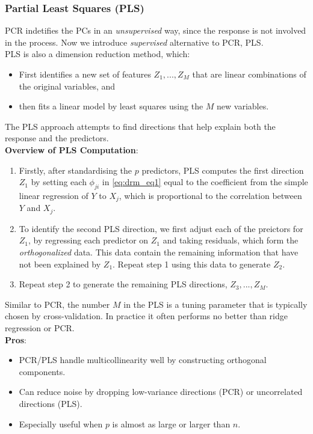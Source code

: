 \documentclass[11pt]{article}
\begin{document}
\subsubsection{Partial Least Squares (PLS)}
\noindent PCR indetifies the PCs in an \textit{unsupervised} way, since the response is not involved in the process. Now we introduce \textit{supervised} alternative to PCR, PLS. \\

\noindent PLS is also a dimension reduction method, which:
\begin{itemize}
    \item First identifies a new set of features $Z_1,...,Z_M$ that are linear combinations of the original variables, and
    \item then fits a linear model by least squares using the $M$ new variables.
\end{itemize}
\noindent The PLS approach attempts to find directions that help explain both the response and the predictors. \\

\noindent \textbf{Overview of PLS Computation}:
\begin{enumerate}
    \item Firstly, after standardising the $p$ predictors, PLS computes the first direction $Z_1$ by setting each $\phi_{ji}$ in \eqref{eq:drm_eq1} equal to the coefficient from the simple linear regression of $Y$ to $X_j$, which is proportional to the correlation between $Y$ and $X_j$.
    \item To identify the second PLS direction, we first adjust each of the preictors for $Z_1$, by regressing each predictor on $Z_1$ and taking residuals, which form the \textit{orthogonalized} data. This data contain the remaining information that have not been explained by $Z_1$. Repeat step 1 using this data to generate $Z_2$.
    \item Repeat step 2 to generate the remaining PLS directions, $Z_3,...,Z_M$.
\end{enumerate}
\noindent Similar to PCR, the number $M$ in the PLS is a tuning parameter that is typically chosen by cross-validation. In practice it often performs no better than ridge regression or PCR. \\

\noindent \textbf{Pros}:
\begin{itemize}
    \item PCR/PLS handle multicollinearity well by constructing orthogonal components.
    \item Can reduce noise by dropping low-variance directions (PCR) or uncorrelated directions (PLS).
    \item Especially useful when $p$ is almost as large or larger than $n$.
\end{itemize} \phantom{i}
\end{document}
